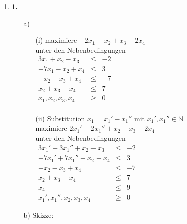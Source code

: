 \documentclass[a4paper,11pt]{article}
\author{\authorinfo}
\title{\titleinfo}
\date{\today}
\begin{document}
\maketitle
\begin {enumerate}
\item[\textbf{1.}]
    \begin{enumerate}
    \item[a)]
        \begin{enumerate}
        \item[(i)]
            maximiere \(-2x_1-x_2+x_3-2x_4\) \\
            unter den Nebenbedingungen \\
            \(\begin{array}{rcr}
                3x_1 + x_2 - x_3 & \leq & -2 \\
                - 7x_1 - x_2 + x_4 & \leq & 3 \\
                - x_2 - x_3 + x_4 & \leq & - 7 \\
                x_2 + x_3 - x_4 & \leq & 7 \\
                x_1,x_2,x_3,x_4 & \geq & 0 \\
            \end{array}\)

        \item[(ii)]
            Substitution \(x_1 = x_1'-x_1''\) mit \(x_1', x_1'' \in \mathbb{N} \) \\
            maximiere \(2x_1'-2x_1''+x_2-x_3+2x_4\) \\
            unter den Nebenbedingungen \\
            \(\begin{array}{rcr}
                3x_1'-3x_1'' + x_2 - x_3 & \leq & -2 \\
                -7x_1'+7x_1'' - x_2 + x_4 & \leq & 3 \\
                - x_2 - x_3 + x_4 & \leq & -7 \\
                x_2 + x_3 - x_4 & \leq & 7 \\
                x_4 & \leq & 9 \\
                x_1',x_1'',x_2,x_3,x_4 & \geq & 0
            \end{array}\)
        \end{enumerate}

    \item[b)]
        Skizze:


\end{enumerate}
\end{enumerate}
\end{document}
